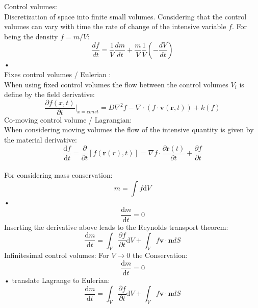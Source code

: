 \documentclass[hyperref]{labbook}
\numberwithin{equation}{experiment}
\numberwithin{table}{experiment}
\numberwithin{figure}{experiment}
\begin{document}
Control volumes:\\
Discretization of space into finite small volumes. Considering that the control volumes can vary with time the rate of change of the intensive variable $f$. For being the density $f = m/V$:
\begin{equation}
\frac{df}{dt} = \frac{1}{V}\frac{dm}{dt} + \frac{m}{V}\frac{1}{V}\left( -\frac{dV}{dt}\right)
\end{equation}•\\[1em]
Fixes control volumes / Eulerian :\\
When using fixed control volumes the flow between the control volumes $V_i$ is define by the field derivative: 
 \begin{equation}
\frac{\partial f(x,t)}{\partial t }|_{x=const} = D\nabla^2f - \nabla \cdot (f \cdot \mathbf{v}(\mathbf{r},t)) + k(f)
\end{equation}
Co-moving control volume / Lagrangian: \\
When considering moving volumes the flow of the intensive quantity is given by the material derivative: 
\begin{equation}
\frac{\mathrm{d}f}{\mathrm{d}t} = \frac{\partial}{\partial t} \left[f(\mathbf{r}(r), t ) \right] = \nabla f \cdot \frac{\partial  \mathbf{r}(t)}{\partial t} + \frac{\partial f }{\partial t}
\end{equation}\\[1em]
For considering mass conservation: 
\begin{equation}
m = \int f \mathrm{d}V  
\end{equation}•
\begin{equation}
\frac{\mathrm{d}m}{\mathrm{d}t} = 0 
\end{equation}
Inserting the derivative above leads to the Reynolds transport theorem:
\begin{equation}
\frac{\mathrm{d}m}{\mathrm{d}t} =  \int_V \frac{\partial f }{\partial t} \mathrm{d }V + \int_V f \mathbf{v}\cdot \mathbf{n} dS
\end{equation}
Infinitesimal control volumes:
For  $V \rightarrow 0 $ the 
Conservation: 
\begin{equation}
\frac{\mathrm{d}m}{\mathrm{d}t} = 0  
\end{equation}•
translate Lagrange to Eulerian: 
\begin{equation}
\frac{\mathrm{d}m}{\mathrm{d}t}  = \int_V \frac{\partial f }{\partial t} \mathrm{d}V +  \int_V f \mathbf{v}\cdot \mathbf{n} dS
\end{equation}
\end{document}
